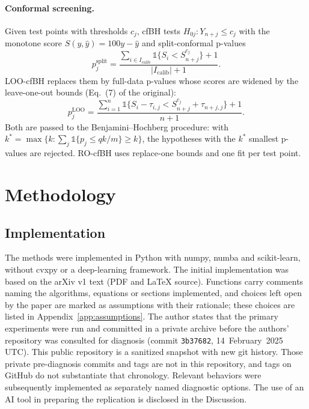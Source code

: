 \paragraph{Conformal screening.} Given test points with thresholds $c_j$, cfBH\supercite{jin2023selection} tests
$H_{0j}: Y_{n+j}\le c_j$ with the monotone score $S(y,\hat y)=100y-\hat y$ and split-conformal p-values
\begin{equation}
  p^{\mathrm{split}}_j=\frac{\sum_{i\in I_{\mathrm{calib}}}\mathbb 1\{S_i<S^{c_j}_{n+j}\}+1}{|I_{\mathrm{calib}}|+1}.
\end{equation}
LOO-cfBH replaces them by full-data p-values whose scores are widened by the leave-one-out bounds (Eq.~(7) of the
original):
\begin{equation}
  p^{\mathrm{LOO}}_j=\frac{\sum_{i=1}^n\mathbb 1\{S_i-\tau_{i,j}<S^{c_j}_{n+j}+\tau_{n+j,j}\}+1}{n+1}.
  \label{eq:loop}
\end{equation}
Both are passed to the Benjamini--Hochberg procedure\supercite{benjamini1995controlling}: with
$k^*=\max\{k:\sum_j\mathbb 1\{p_j\le qk/m\}\ge k\}$, the hypotheses with the $k^*$ smallest p-values are rejected.
RO-cfBH uses replace-one bounds and one fit per test point.

\section{Methodology}
\label{sec:methods}

\subsection{Implementation}

The methods were implemented in Python with numpy, numba and scikit-learn, without cvxpy or a deep-learning framework. The initial implementation was based on the arXiv v1 text (PDF and \LaTeX{} source). Functions carry comments naming the algorithms, equations or sections implemented, and choices left open by the paper are marked as assumptions with their rationale; these choices are listed in Appendix~\ref{app:assumptions}. The author states that the primary experiments were run and committed in a private archive before the authors' repository\supercite{authorscode} was consulted for diagnosis (commit \texttt{3b37682}, 14~February~2025 UTC). This public repository is a sanitized snapshot with new git history. Those private pre-diagnosis commits and tags are not in this repository, and tags on GitHub do not substantiate that chronology. Relevant behaviors were subsequently implemented as separately named diagnostic options. The use of an AI tool in preparing the replication is disclosed in the Discussion.

